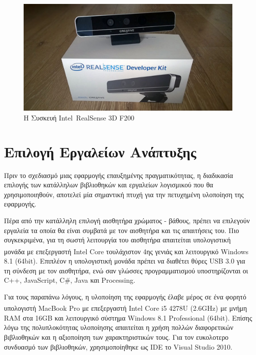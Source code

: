 \begin{figure}[H]
    \centering
    \includegraphics[scale=0.35, angle=0]{Files/Figures/RealSenseCamera.pdf}
    \caption[Η Συσκευή Intel\textsuperscript{\textregistered} RealSense\texttrademark{} 3D F200]{Η Συσκευή Intel\textregistered\ RealSense\texttrademark{} 3D F200}
    \label{fig:realsense}
\end{figure}



\section{Επιλογή Εργαλείων Ανάπτυξης}


Πριν το σχεδιασμό μιας εφαρμογής επαυξημένης πραγματικότητας, η διαδικασία επιλογής των κατάλληλων βιβλιοθηκών και εργαλείων λογισμικού που θα χρησιμοποιηθούν, αποτελεί μία σημαντική πτυχή για την πετυχημένη υλοποίηση της εφαρμογής. 


Πέρα από την κατάλληλη επιλογή αισθητήρα χρώματος - βάθους,
πρέπει να επιλεγούν εργαλεία τα οποία θα είναι συμβατά με τον αισθητήρα και τις απαιτήσεις του. Πιο συγκεκριμένα, για τη σωστή λειτουργία του αισθητήρα απαιτείται υπολογιστική μονάδα με επεξεργαστή Intel\textsuperscript{\textregistered} Core\texttrademark{} τουλάχιστον 4ης γενιάς και λειτουργικό Windows 8.1 (64bit). Επιπλέον η υπολογιστική μονάδα πρέπει να διαθέτει θύρες USB 3.0 για τη σύνδεση με τον αισθητήρα, ενώ σαν γλώσσες προγραμματισμού υποστηρίζονται οι C++, JavaScript, C\#, Java και Processing.


Για τους παραπάνω λόγους, η υλοποίηση της εφαρμογής έλαβε μέρος σε ένα φορητό υπολογιστή  MacBook Pro με επεξεργαστή Intel\textsuperscript{\textregistered} Core\texttrademark{} i5 4278U (2.6GHz) με μνήμη RAM στα 16GB και λειτουργικό σύστημα Windows 8.1 Professional (64bit). Επίσης λόγω της πολυπλοκότητας υλοποίησης απαιτείται η χρήση πολλών διαφορετικών βιβλιοθηκών και η αξιοποίηση των χαρακτηριστικών τους. Για τον ευκολοτερο συνδυασμό των βιβλιοθηκών, χρησιμοποίηθηκε ως IDE το Visual Studio 2010.


